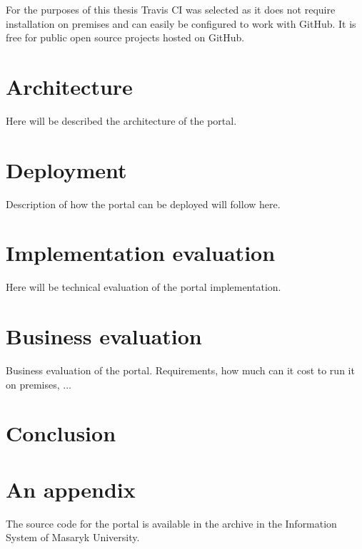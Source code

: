 \documentclass[
  digital, %
  table,   %
  lof,     %
  nolot,     %
]{fithesis3}
\begin{document}
For the purposes of this thesis Travis CI was selected as it does not require installation on premises and can easily be configured to work with GitHub. It is free for public open source projects hosted on GitHub.

\chapter{Architecture}
Here will be described the architecture of the portal.

\chapter{Deployment}
Description of how the portal can be deployed will follow here.

\chapter{Implementation evaluation}
Here will be technical evaluation of the portal implementation.

\chapter{Business evaluation}
Business evaluation of the portal. Requirements, how much can it cost to run it on premises, ...

\chapter{Conclusion}

\printbibliography[heading=bibintoc] %

\appendix %
\chapter{An appendix}
The source code for the portal is available in the archive in the Information System of Masaryk University.
\end{document}
